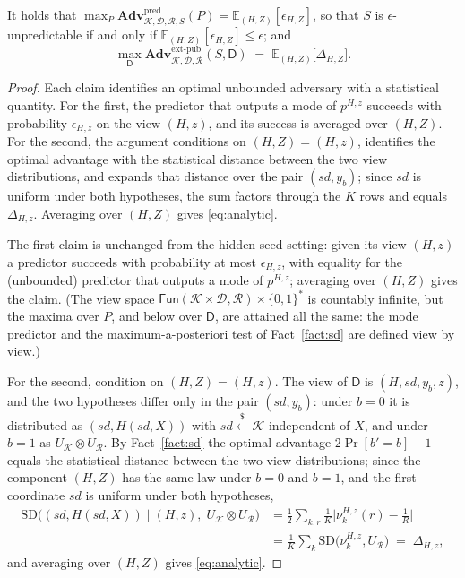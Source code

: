\documentclass{aicr-solution}
\newcommand{\Fun}{\mathsf{Fun}}
\newcommand{\Adv}{\mathbf{Adv}}
\newcommand{\pred}{\mathrm{pred}}
\newcommand{\extp}{\mathrm{ext}\text{-}\mathrm{pub}}
\newcommand{\sd}{\mathit{sd}}
\renewcommand{\sample}{\stackrel{{\scriptscriptstyle\$}}{\leftarrow}}
\newcommand{\SD}{\mathrm{SD}}
\newcommand{\calK}{\mathcal{K}}
\newcommand{\calD}{\mathcal{D}}
\newcommand{\calR}{\mathcal{R}}
\begin{document}
\begin{lemma}\label{lem:analytic}
It holds that
$\max_{P} \Adv^{\pred}_{\calK,\calD,\calR,S}(P) = \mathbb{E}_{(H,Z)}[\epsilon_{H,Z}]$, so that
$S$ is $\epsilon$-unpredictable if and only if $\mathbb{E}_{(H,Z)}[\epsilon_{H,Z}] \le \epsilon$;
and
\begin{equation}\label{eq:analytic}
  \max_{\mathsf{D}}\Adv^{\extp}_{\calK,\calD,\calR}(S,\mathsf{D})
  \;=\; \mathbb{E}_{(H,Z)}\bigl[\Delta_{H,Z}\bigr] .
\end{equation}
\end{lemma}

\begin{proof}
Each claim identifies an optimal unbounded adversary with a statistical quantity. For the first,
the predictor that outputs a mode of $p^{H,z}$ succeeds with probability $\epsilon_{H,z}$ on the
view $(H,z)$, and its success is averaged over $(H,Z)$. For the second, the argument conditions on
$(H,Z) = (H,z)$, identifies the optimal advantage with the statistical distance between the two
view distributions, and expands that distance over the pair $(\sd,y_b)$; since $\sd$ is uniform
under both hypotheses, the sum factors through the $K$ rows and equals $\Delta_{H,z}$. Averaging
over $(H,Z)$ gives \eqref{eq:analytic}.

The first claim is unchanged from the hidden-seed setting: given its view $(H,z)$ a predictor
succeeds with probability at most $\epsilon_{H,z}$, with equality for the (unbounded) predictor
that outputs a mode of $p^{H,z}$; averaging over $(H,Z)$ gives the claim. (The view space
$\Fun(\calK \times \calD, \calR) \times \{0,1\}^{*}$ is countably infinite, but the maxima over
$P$, and below over $\mathsf{D}$, are attained all the same: the mode predictor and the
maximum-a-posteriori test of Fact~\ref{fact:sd} are defined view by view.)

For the second, condition on $(H,Z) = (H,z)$. The view of $\mathsf{D}$ is $(H, \sd, y_b, z)$, and
the two hypotheses differ only in the pair $(\sd, y_b)$: under $b = 0$ it is distributed as
$(\sd, H(\sd,X))$ with $\sd \sample \calK$ independent of $X$, and under $b = 1$ as
$U_{\calK} \otimes U_{\calR}$. By Fact~\ref{fact:sd} the optimal advantage $2\Pr[b'=b]-1$ equals the
statistical distance between the two view distributions; since the component $(H,Z)$ has the same
law under $b=0$ and $b=1$, and the first coordinate $\sd$ is uniform under both hypotheses,
\begin{align*}
  \SD\bigl((\sd, H(\sd,X)) \mid (H,z),\; U_{\calK}\otimes U_{\calR}\bigr)
  &= \tfrac12 \sum_{k,r} \tfrac1K \bigl|\nu^{H,z}_{k}(r) - \tfrac1R\bigr| \\
  &= \frac1K \sum_{k} \SD\bigl(\nu^{H,z}_{k}, U_{\calR}\bigr)
  \;=\; \Delta_{H,z},
\end{align*}
and averaging over $(H,Z)$ gives \eqref{eq:analytic}.
\end{proof}
\end{document}
